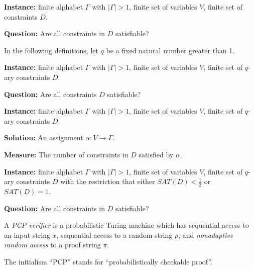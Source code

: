 \documentclass[]{article}
\begin{document}
\begin{definition}
  \mbox{}

  \textbf{Instance:} finite alphabet $\Gamma$ with $|\Gamma| > 1$, finite set of variables $V$, finite set of constraints $D$.

  \textbf{Question:} Are all constraints in $D$ satisfiable?
\end{definition}

In the following definitions, let $q$ be a fixed natural number greater than 1.

\begin{definition}
  \mbox{}

  \textbf{Instance:} finite alphabet $\Gamma$ with $|\Gamma| > 1$, finite set of variables $V$, finite set of $q$-ary constraints $D$.

  \textbf{Question:} Are all constraints $D$ satisfiable?
\end{definition}

\begin{definition}
  \mbox{}

  \textbf{Instance:} finite alphabet $\Gamma$ with $|\Gamma| > 1$, finite set of variables $V$, finite set of $q$-ary constraints $D$.

  \textbf{Solution:} An assignment $\alpha \colon V \to \Gamma$.

  \textbf{Measure:} The number of constraints in $D$ satisfied by $\alpha$.
\end{definition}

\begin{definition}
  \mbox{}

  \textbf{Instance:} finite alphabet $\Gamma$ with $|\Gamma| > 1$, finite set of variables $V$, finite set of $q$-ary constraints $D$ with the restriction that either $SAT(D) < \frac{1}{2}$ or $SAT(D) = 1$.

  \textbf{Question:} Are all constraints in $D$ satisfiable?
\end{definition}

\begin{definition}
  A \emph{PCP verifier} is a probabilistic Turing machine which has sequential access to an input string $x$, sequential access to a random string $\rho$, and \emph{nonadaptive random access} to a proof string $\pi$.
\end{definition}

The initialism ``PCP'' stands for ``probabilistically checkable proof''.
\end{document}

